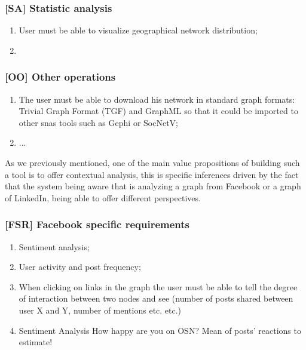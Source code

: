 \subsubsection*{\textbf{[SA] Statistic analysis}}
\begin{enumerate}
    \item User must be able to visualize geographical network distribution;
    \item
\end{enumerate}

\subsubsection*{\textbf{[OO] Other operations}}
\begin{enumerate}
    \item The user must be able to download his network in standard graph formats: Trivial Graph Format (TGF) and GraphML so that it could
    be imported to other \glspl{sna} tools such as Gephi or SocNetV;
    \item ...

\end{enumerate}






As we previously mentioned, one of the main value propositions of building such a tool is to offer contextual analysis, this is specific inferences driven
by the fact that the system being aware that is analyzing a graph from Facebook or a graph of LinkedIn, being able to offer different perspectives.

\subsubsection*{\textbf{[FSR] Facebook specific requirements}}
\begin{enumerate}
    \item Sentiment analysis;
    \item User activity and post frequency;
    \item When clicking on links in the graph the user must be able to tell the degree of interaction between two nodes and see (number of posts shared between user X and Y, number of mentions etc. etc.)
    \item Sentiment Analysis How happy are you on OSN? Mean of posts' reactions to estimate!
\end{enumerate}



